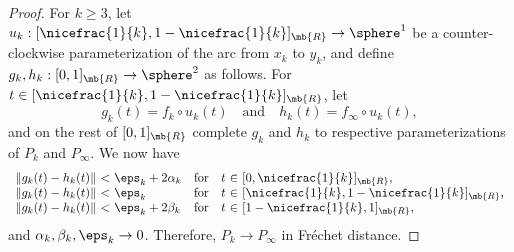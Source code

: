 \begin{proof}
For $k\geq 3$,
let $u_k : [\nicefrac{1}{k},1-\nicefrac{1}{k}]_\mb{R} \to \sphere^1$ be a counter-clockwise parameterization of the arc from $x_k$ to $y_k$, and define $g_k,h_k : [0,1]_\mb{R} \to \sphere^2$ as follows.
For $t \in [\nicefrac{1}{k},1-\nicefrac{1}{k}]_\mb{R}$, let
\[ g_k(t) = f_k \circ u_k(t) \quad \text{and} \quad h_k(t) = f_\infty \circ u_k(t),\]
and on the rest of $[0,1]_\mb{R}$ complete $g_k$ and $h_k$ to respective parameterizations of $P_k$ and $P_\infty$.
We now have
\[\begin{array}{r@{\ <\ }l@{\quad \text{for}\quad }r@{\ \in\ }l}
\|g_k(t)-h_k(t)\| & \eps_k +2\alpha_k & t & [0,\nicefrac{1}{k}]_\mb{R}, \\
\|g_k(t)-h_k(t)\| & \eps_k & t & [\nicefrac{1}{k},1-\nicefrac{1}{k}]_\mb{R}, \\
\|g_k(t)-h_k(t)\| & \eps_k +2\beta_k & t & [1-\nicefrac{1}{k},1]_\mb{R},
\end{array}\]
and $\alpha_k,\beta_k,\eps_k \to 0$. Therefore, $P_k \to P_\infty$ in Fréchet distance.
\end{proof}

